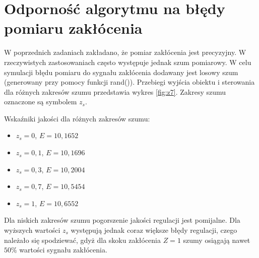\chapter{Odporność algorytmu na błędy pomiaru zakłócenia}
W poprzednich zadaniach zakładano, że pomiar zakłócenia jest precyzyjny. W rzeczywistych zastosowaniach często występuje jednak szum pomiarowy. W celu symulacji błędu pomiaru do sygnału zakłócenia dodawany jest losowy szum (generowany przy pomocy funkcji rand()). Przebiegi wyjścia obiektu i sterowania dla różnych zakresów szumu przedstawia wykres \ref{fig:z7}. Zakresy szumu oznaczone są symbolem $z_s$.

Wskaźniki jakości dla różnych zakresów szumu:
\begin{itemize}
	\item $z_s=0$, $E=10,1652$
	\item $z_s=0,1$, $E=10,1696$
	\item $z_s=0,3$, $E=10,2004$
	\item $z_s=0,7$, $E=10,5454$
	\item $z_s=1$, $E=10,6552$
\end{itemize}
Dla niskich zakresów szumu pogorszenie jakości regulacji jest pomijalne. Dla wyższych wartości $z_s$ występują jednak coraz większe błędy regulacji, czego należało się spodziewać, gdyż dla skoku zakłócenia $Z=1$ szumy osiągają nawet $50\%$ wartości sygnału zakłócenia.

